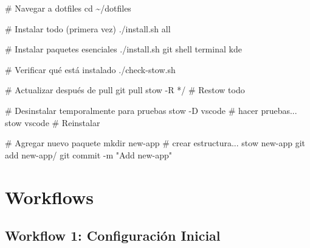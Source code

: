 \documentclass[
  doc,
  floatsintext,
  longtable,
  a4paper,
  nolmodern,
  notxfonts,
  notimes,
  12pt,
  colorlinks=true,linkcolor=blue,citecolor=blue,urlcolor=blue]{apa7}
\newenvironment{Shaded}{\begin{snugshade}}{\end{snugshade}}
\newcommand{\AttributeTok}[1]{\textcolor[rgb]{0.40,0.45,0.13}{#1}}
\newcommand{\BuiltInTok}[1]{\textcolor[rgb]{0.00,0.23,0.31}{#1}}
\newcommand{\CommentTok}[1]{\textcolor[rgb]{0.37,0.37,0.37}{#1}}
\newcommand{\ExtensionTok}[1]{\textcolor[rgb]{0.00,0.23,0.31}{#1}}
\newcommand{\FunctionTok}[1]{\textcolor[rgb]{0.28,0.35,0.67}{#1}}
\newcommand{\NormalTok}[1]{\textcolor[rgb]{0.00,0.23,0.31}{#1}}
\newcommand{\PreprocessorTok}[1]{\textcolor[rgb]{0.68,0.00,0.00}{#1}}
\newcommand{\StringTok}[1]{\textcolor[rgb]{0.13,0.47,0.30}{#1}}
\begin{document}
\begin{Shaded}
\begin{Highlighting}[]
\CommentTok{\# Navegar a dotfiles}
\BuiltInTok{cd}\NormalTok{ \textasciitilde{}/dotfiles}

\CommentTok{\# Instalar todo (primera vez)}
\ExtensionTok{./install.sh}\NormalTok{ all}

\CommentTok{\# Instalar paquetes esenciales}
\ExtensionTok{./install.sh}\NormalTok{ git shell terminal kde}

\CommentTok{\# Verificar qué está instalado}
\ExtensionTok{./check{-}stow.sh}

\CommentTok{\# Actualizar después de pull}
\FunctionTok{git}\NormalTok{ pull}
\ExtensionTok{stow} \AttributeTok{{-}R} \PreprocessorTok{*}\NormalTok{/  }\CommentTok{\# Restow todo}

\CommentTok{\# Desinstalar temporalmente para pruebas}
\ExtensionTok{stow} \AttributeTok{{-}D}\NormalTok{ vscode}
\CommentTok{\# hacer pruebas...}
\ExtensionTok{stow}\NormalTok{ vscode  }\CommentTok{\# Reinstalar}

\CommentTok{\# Agregar nuevo paquete}
\FunctionTok{mkdir}\NormalTok{ new{-}app}
\CommentTok{\# crear estructura...}
\ExtensionTok{stow}\NormalTok{ new{-}app}
\FunctionTok{git}\NormalTok{ add new{-}app/}
\FunctionTok{git}\NormalTok{ commit }\AttributeTok{{-}m} \StringTok{"Add new{-}app"}
\end{Highlighting}
\end{Shaded}

\section{Workflows}\label{workflows}

\subsection{Workflow 1: Configuración
Inicial}\label{workflow-1-configuraciuxf3n-inicial}
\end{document}
